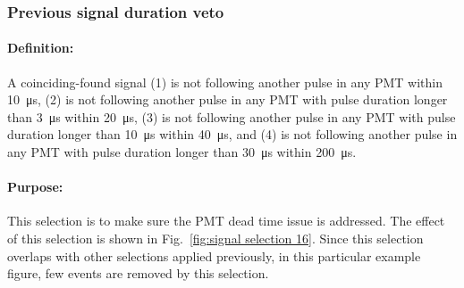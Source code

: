 \subsubsection{Previous signal duration veto}
\paragraph{Definition:}
A coinciding-found signal (1) is not following another pulse in any PMT within \SI{10}{\us}, (2) is not following another pulse in any PMT with pulse duration longer than \SI{3}{\us} within \SI{20}{\us}, (3) is not following another pulse in any PMT with pulse duration longer than \SI{10}{\us} within \SI{40}{\us}, and (4) is not following another pulse in any PMT with pulse duration longer than \SI{30}{\us} within \SI{200}{\us}.
\paragraph{Purpose:}
This selection is to make sure the PMT dead time issue is addressed. The effect of this selection is shown in Fig.~\ref{fig:signal selection 16}. Since this selection overlaps with other selections applied previously, in this particular example figure, few events are removed by this selection.

